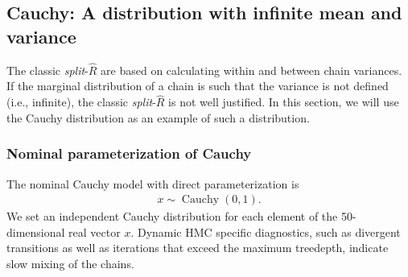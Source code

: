 \documentclass[american,]{article}
\let\oldparagraph\paragraph
\renewcommand{\paragraph}[1]{\oldparagraph{#1}\mbox{}}
\DeclareMathOperator{\Cauchy}{Cauchy}
\begin{document}
\hypertarget{cauchy-a-distribution-with-infinite-mean-and-variance}{%
\subsection{Cauchy: A distribution with infinite mean and
variance}\label{cauchy-a-distribution-with-infinite-mean-and-variance}}

The classic \emph{split}-\(\widehat{R}\) are based on calculating
within and between chain variances. If the marginal distribution of a
chain is such that the variance is not defined (i.e., infinite), the
classic \emph{split}-\(\widehat{R}\) is not well justified. In this
section, we will use the Cauchy distribution as an example of such a
distribution. 

\hypertarget{nominal-parameterization-of-cauchy}{%
\subsubsection{Nominal parameterization of
Cauchy}\label{nominal-parameterization-of-cauchy}}






The nominal Cauchy model with direct parameterization is
\begin{align}
  x \sim \Cauchy(0,1).
\end{align}
We set an independent Cauchy distribution for each element of the 50-dimensional 
real vector $x$. Dynamic HMC specific diagnostics, such as divergent
transitions as well as iterations that exceed the maximum treedepth,
indicate slow mixing of the chains.

\end{document}

